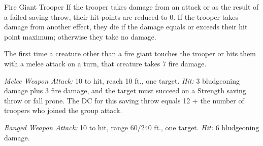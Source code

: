 \documentclass[10pt,a4paper,twoside,bg=print,twocolumn,openany,nodeprecatedcode]{dndbook}
\begin{document}
\begin{DndMonster}[float=t]{Fire Giant Trooper}
\DndMonsterBasics[
armor-class = {18 (natural armor)},
hit-points = {\DndDice{19}},
speed = {40 ft.}
]
\DndMonsterAbilityScores[
 str = 22,
 dex = 14,
 con = 19,
 int = 10,
 wis = 14,
 cha = 13
]
\DndMonsterDetails[
damage-immunities = {fire},
languages = {Giant},
challenge = 12,
]
If the trooper takes damage from an attack or as the result of a failed saving throw, their hit points are reduced to 0. If the trooper takes damage from another effect, they die if the damage equals or exceeds their hit point maximum; otherwise they take no damage.

The first time a creature other than a fire giant touches the trooper or hits them with a melee attack on a turn, that creature takes 7 fire damage.

\textsl{Melee Weapon Attack:} 10 to hit, reach 10 ft., one target. \textsl{Hit:} 3 bludgeoning damage plus 3 fire damage, and the target must succeed on a Strength saving throw or fall prone. The DC for this saving throw equals 12 + the number of troopers who joined the group attack.

\textsl{Ranged Weapon Attack:} 10 to hit, range 60/240 ft., one target. \textsl{Hit:} 6 bludgeoning damage.

\end{DndMonster}
\end{document}
